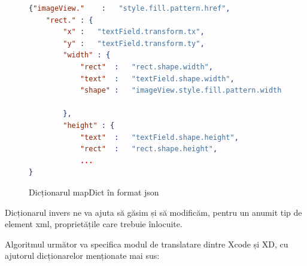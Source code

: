 \begin{figure}[!htbp]
\begin{lstlisting}[language=json,firstnumber=1]
{"imageView."    :   "style.fill.pattern.href",
    "rect." : {
        "x" :   "textField.transform.tx",
        "y" :   "textField.transform.ty",
        "width" : {
            "rect"  :   "rect.shape.width",
            "text"  :   "textField.shape.width",
            "shape" :   "imageView.style.fill.pattern.width"
        
        },
        "height" : {
            "text"  :   "textField.shape.height",
            "rect"  :   "rect.shape.height",
            ...
}
\end{lstlisting}
\caption{Dicționarul mapDict în format json} \label{fig:MapDict Schema}
\end{figure}

Dicționarul invers ne va ajuta să găsim și să modificăm, pentru un anumit tip de element xml, proprietățile care trebuie înlocuite. 

Algoritmul următor va specifica modul de translatare dintre Xcode și XD, cu ajutorul dicționarelor menționate mai sus:

